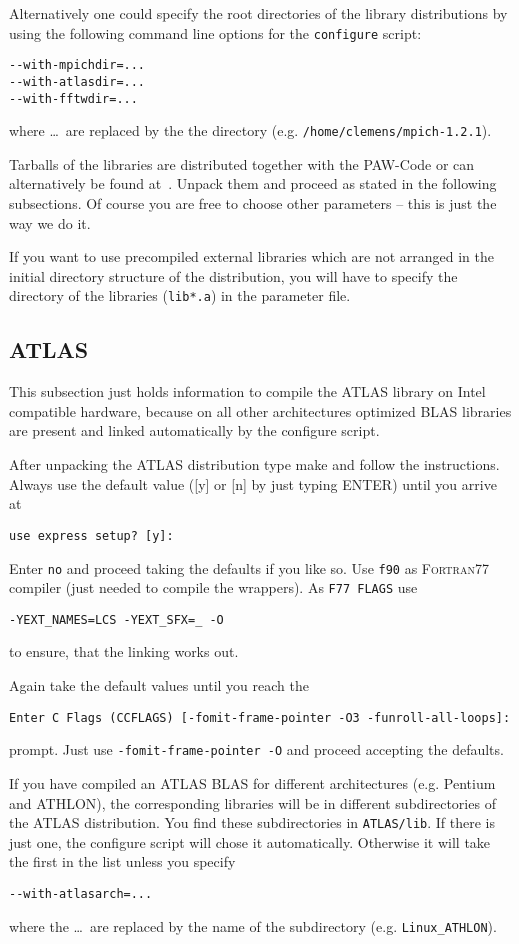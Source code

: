 \documentclass[a4paper,10pt]{article}
\newcommand{\PAW}{\textsc{PAW}}
\begin{document}
Alternatively one could specify the root directories of the library
distributions by using the following command line options for the
\texttt{configure} script:
\begin{verbatim}
--with-mpichdir=...
--with-atlasdir=...
--with-fftwdir=...
\end{verbatim}
where \ldots\ are replaced by the the directory (e.g. \texttt{/home/clemens/mpich-1.2.1}).  

Tarballs of the libraries are distributed together with the \PAW-Code or can
alternatively be found at~\cite{mpich,atlas,fftw}.  Unpack them and proceed as
stated in the following subsections.  Of course you are free to choose other
parameters -- this is just the way we do it.

If you want to use precompiled external libraries which are not arranged in the
initial directory structure of the distribution, you will have to specify the
directory of the libraries (\texttt{lib*.a}) in the parameter file.

\subsection{ATLAS}

This subsection just holds information to compile the ATLAS library on Intel
compatible hardware, because on all other architectures optimized BLAS
libraries are present and linked automatically by the configure script.

After unpacking the ATLAS distribution type make and follow the
instructions. Always use the default value ([y] or [n] by just typing ENTER) until you arrive at
\begin{verbatim}
use express setup? [y]:
\end{verbatim}
Enter \texttt{no} and proceed taking the defaults if you like so.  
Use \texttt{f90} as  \textsc{Fortran77} compiler (just needed to compile the wrappers). As \texttt{F77 FLAGS} use
\begin{verbatim}
-YEXT_NAMES=LCS -YEXT_SFX=_ -O
\end{verbatim}
to ensure, that the linking works out.

Again take the default values until you reach the 
\begin{verbatim}
Enter C Flags (CCFLAGS) [-fomit-frame-pointer -O3 -funroll-all-loops]: 
\end{verbatim}
prompt.  Just use \texttt{-fomit-frame-pointer -O} and proceed accepting the defaults.

If you have compiled an ATLAS BLAS for different architectures (e.g. Pentium
and ATHLON), the corresponding libraries will be in different subdirectories of
the ATLAS distribution. You find these subdirectories in \texttt{ATLAS/lib}.
If there is just one, the configure script will chose it
automatically. Otherwise it will take the first in the list unless you specify
\begin{verbatim}
--with-atlasarch=...
\end{verbatim}
where the \ldots\ are replaced by the name of the subdirectory (e.g. \texttt{Linux\_ATHLON}).
\end{document}
